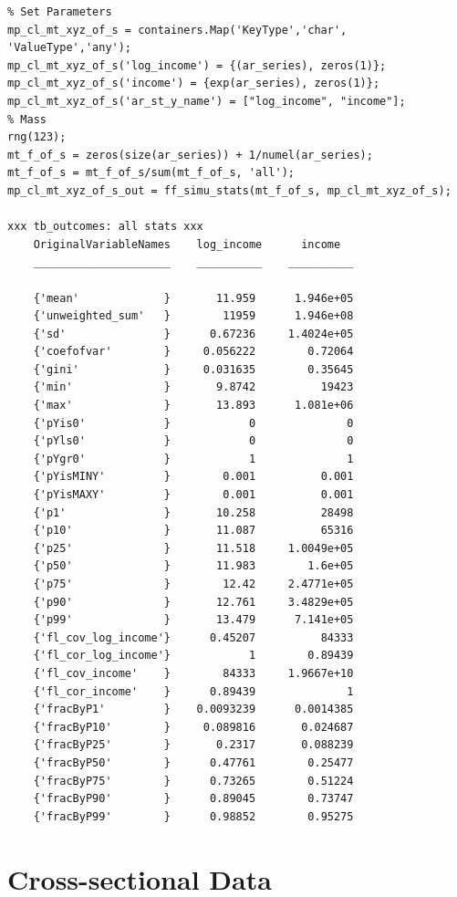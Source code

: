\documentclass[
]{book}
\begin{document}
\begin{verbatim}
% Set Parameters
mp_cl_mt_xyz_of_s = containers.Map('KeyType','char', 'ValueType','any');
mp_cl_mt_xyz_of_s('log_income') = {(ar_series), zeros(1)};
mp_cl_mt_xyz_of_s('income') = {exp(ar_series), zeros(1)};
mp_cl_mt_xyz_of_s('ar_st_y_name') = ["log_income", "income"];
% Mass
rng(123);
mt_f_of_s = zeros(size(ar_series)) + 1/numel(ar_series);
mt_f_of_s = mt_f_of_s/sum(mt_f_of_s, 'all');
mp_cl_mt_xyz_of_s_out = ff_simu_stats(mt_f_of_s, mp_cl_mt_xyz_of_s);

xxx tb_outcomes: all stats xxx
    OriginalVariableNames    log_income      income  
    _____________________    __________    __________

    {'mean'             }       11.959      1.946e+05
    {'unweighted_sum'   }        11959      1.946e+08
    {'sd'               }      0.67236     1.4024e+05
    {'coefofvar'        }     0.056222        0.72064
    {'gini'             }     0.031635        0.35645
    {'min'              }       9.8742          19423
    {'max'              }       13.893      1.081e+06
    {'pYis0'            }            0              0
    {'pYls0'            }            0              0
    {'pYgr0'            }            1              1
    {'pYisMINY'         }        0.001          0.001
    {'pYisMAXY'         }        0.001          0.001
    {'p1'               }       10.258          28498
    {'p10'              }       11.087          65316
    {'p25'              }       11.518     1.0049e+05
    {'p50'              }       11.983        1.6e+05
    {'p75'              }        12.42     2.4771e+05
    {'p90'              }       12.761     3.4829e+05
    {'p99'              }       13.479      7.141e+05
    {'fl_cov_log_income'}      0.45207          84333
    {'fl_cor_log_income'}            1        0.89439
    {'fl_cov_income'    }        84333     1.9667e+10
    {'fl_cor_income'    }      0.89439              1
    {'fracByP1'         }    0.0093239      0.0014385
    {'fracByP10'        }     0.089816       0.024687
    {'fracByP25'        }       0.2317       0.088239
    {'fracByP50'        }      0.47761        0.25477
    {'fracByP75'        }      0.73265        0.51224
    {'fracByP90'        }      0.89045        0.73747
    {'fracByP99'        }      0.98852        0.95275
\end{verbatim}

\hypertarget{cross-sectional-data}{%
\section{Cross-sectional Data}\label{cross-sectional-data}}
\end{document}
